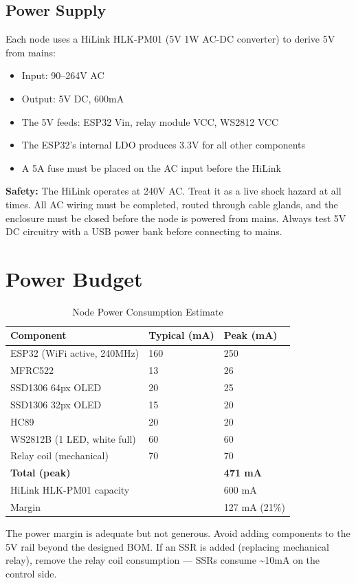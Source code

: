 \subsection{Power Supply}

Each node uses a HiLink HLK-PM01 (5V 1W AC-DC converter) to derive 5V from mains:

\begin{itemize}[leftmargin=1.5em]
    \item Input: 90--264V AC
    \item Output: 5V DC, 600mA
    \item The 5V feeds: ESP32 Vin, relay module VCC, WS2812 VCC
    \item The ESP32's internal LDO produces 3.3V for all other components
    \item A 5A fuse must be placed on the AC input before the HiLink
\end{itemize}

\begin{warnbox}
\textbf{Safety:} The HiLink operates at 240V AC. Treat it as a live shock hazard at all times. All AC wiring must be completed, routed through cable glands, and the enclosure must be closed before the node is powered from mains. Always test 5V DC circuitry with a USB power bank before connecting to mains.
\end{warnbox}

\section{Power Budget}

\begin{table}[H]
\centering
\caption{Node Power Consumption Estimate}
\begin{tabular}{L{5cm}C{3cm}C{3cm}}
\toprule
\textbf{Component} & \textbf{Typical (mA)} & \textbf{Peak (mA)} \\
\midrule
ESP32 (WiFi active, 240MHz) & 160 & 250 \\
MFRC522 & 13 & 26 \\
SSD1306 64px OLED & 20 & 25 \\
SSD1306 32px OLED & 15 & 20 \\
HC89 & 20 & 20 \\
WS2812B (1 LED, white full) & 60 & 60 \\
Relay coil (mechanical) & 70 & 70 \\
\midrule
\textbf{Total (peak)} & & \textbf{471 mA} \\
\midrule
HiLink HLK-PM01 capacity & & 600 mA \\
Margin & & 127 mA (21\%) \\
\bottomrule
\end{tabular}
\end{table}

\begin{notebox}
The power margin is adequate but not generous. Avoid adding components to the 5V rail beyond the designed BOM. If an SSR is added (replacing mechanical relay), remove the relay coil consumption --- SSRs consume \textasciitilde{}10mA on the control side.
\end{notebox}
